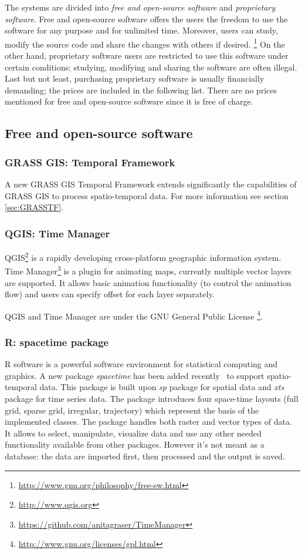 \documentclass[a4paper,12pt,oneside]{book}
\begin{document}
The systems are divided into \emph{free and open-source software}
and \emph{proprietary software}.
Free and open-source software offers the users the freedom to use the software for any purpose
and for unlimited time. Moreover, users can study, modify the source code
and share the changes with others if desired.%
\footnote{\url{http://www.gnu.org/philosophy/free-sw.html}}
On the other hand, proprietary software users are restricted to use this software under certain conditions;
studying, modifying and sharing the software are often illegal.
Last but not least, purchasing proprietary software is usually financially demanding;
the prices are included in the following list.
There are no prices mentioned for free and open-source software since it is free of charge.



\subsection{Free and open-source software}
\subsubsection{GRASS GIS: Temporal Framework}
A new GRASS GIS Temporal Framework extends significantly the capabilities of GRASS GIS
to process spatio-temporal data. For more information see section \ref{sec:GRASSTF}.

\subsubsection{QGIS: Time Manager}
QGIS\footnote{\url{http://www.qgis.org}} is a rapidly developing cross-platform
geographic information system. Time Manager\footnote{\url{https://github.com/anitagraser/TimeManager}}
is a plugin for animating maps, currently multiple vector layers are supported.
It allows basic animation functionality (to control the animation flow) and
users can specify offset for each layer separately.

QGIS and Time Manager are under the GNU General Public License%
\footnote{\url{http://www.gnu.org/licenses/gpl.html}}.

\subsubsection{R: spacetime package}
R software is a powerful software environment for statistical computing and graphics.
A new package \emph{spacetime} has been added recently~\cite{PebesmaR} to support spatio-temporal data.
This package is built upon \emph{sp} package for spatial data and
\emph{xts} package for time series data.
The package introduces four space-time layouts (full grid, sparse grid, irregular, trajectory)
which represent the basis of the implemented classes.
The package handles both raster and vector types of data.
It allows to select, manipulate, visualize data and use any other needed functionality
available from other packages. However it's not meant as a database:
the data are imported first, then processed and the output is saved.
\end{document}
